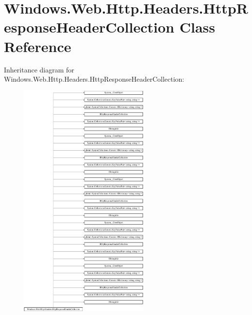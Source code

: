 \hypertarget{class_windows_1_1_web_1_1_http_1_1_headers_1_1_http_response_header_collection}{}\section{Windows.\+Web.\+Http.\+Headers.\+Http\+Response\+Header\+Collection Class Reference}
\label{class_windows_1_1_web_1_1_http_1_1_headers_1_1_http_response_header_collection}
Inheritance diagram for Windows.\+Web.\+Http.\+Headers.\+Http\+Response\+Header\+Collection\+:\begin{figure}[H]
\begin{center}
\leavevmode
\includegraphics[height=12.000000cm]{class_windows_1_1_web_1_1_http_1_1_headers_1_1_http_response_header_collection}
\end{center}
\end{figure}
